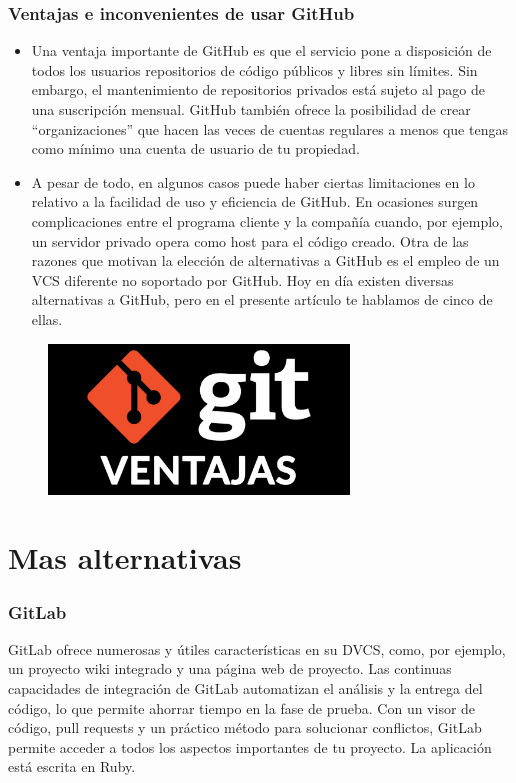 \documentclass[12pt,letterpaper]{article}
\begin{document}
\section{Ventajas e inconvenientes de usar GitHub}
\begin{itemize}
\item Una ventaja importante de GitHub es que el servicio pone a disposición de todos los usuarios repositorios de código públicos y libres sin límites. Sin embargo, el mantenimiento de repositorios privados está sujeto al pago de una suscripción mensual. GitHub también ofrece la posibilidad de crear “organizaciones” que hacen las veces de cuentas regulares a menos que tengas como mínimo una cuenta de usuario de tu propiedad.
\item A pesar de todo, en algunos casos puede haber ciertas limitaciones en lo relativo a la facilidad de uso y eficiencia de GitHub. En ocasiones surgen complicaciones entre el programa cliente y la compañía cuando, por ejemplo, un servidor privado opera como host para el código creado. Otra de las razones que motivan la elección de alternativas a GitHub es el empleo de un VCS diferente no soportado por GitHub. Hoy en día existen diversas alternativas a GitHub, pero en el presente artículo te hablamos de cinco de ellas.
\end{itemize}

\vspace*{-0.025in}
\begin{figure}[htb]
\begin{center}
\includegraphics[width=8cm]{./Imagenes/ventajas-uso-git}
\end{center}
\end{figure}

\part{ Mas alternativas }

\section{GitLab}
GitLab ofrece numerosas y útiles características en su DVCS, como, por ejemplo, un proyecto wiki integrado y una página web de proyecto. Las continuas capacidades de integración de GitLab automatizan el análisis y la entrega del código, lo que permite ahorrar tiempo en la fase de prueba. Con un visor de código, pull requests y un práctico método para solucionar conflictos, GitLab permite acceder a todos los aspectos importantes de tu proyecto. La aplicación está escrita en Ruby.
\end{document}
